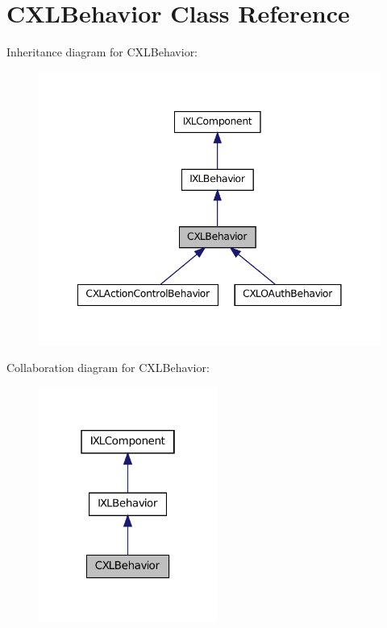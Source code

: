 \hypertarget{classCXLBehavior}{
\section{CXLBehavior Class Reference}
\label{classCXLBehavior}
}


Inheritance diagram for CXLBehavior:\nopagebreak
\begin{figure}[H]
\begin{center}
\leavevmode
\includegraphics[width=344pt]{classCXLBehavior__inherit__graph}
\end{center}
\end{figure}


Collaboration diagram for CXLBehavior:\nopagebreak
\begin{figure}[H]
\begin{center}
\leavevmode
\includegraphics[width=166pt]{classCXLBehavior__coll__graph}
\end{center}
\end{figure}
